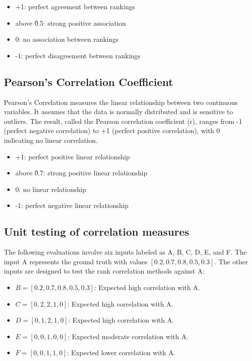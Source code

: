 \begin{itemize}
    \item +1: perfect agreement between rankings
    \item above \~ 0.5: strong positive association
    \item 0: no association between rankings
    \item -1: perfect disagreement between rankings
\end{itemize}

\subsection{Pearson's Correlation Coefficient}\label{pearsons-correlation-coefficient}

Pearson's Correlation measures the linear relationship between two continuous variables. It assumes that the data is normally distributed and is sensitive to outliers. The result, called the Pearson correlation coefficient (r), ranges from -1 (perfect negative correlation) to +1 (perfect positive correlation), with 0 indicating no linear correlation.

\begin{itemize}
    \item +1: perfect positive linear relationship
    \item above \~ 0.7: strong positive linear relationship
    \item 0: no linear relationship
    \item -1: perfect negative linear relationship
\end{itemize}

\subsection{Unit testing of correlation measures}\label{unit-testing-of-correlation-measures}

The following evaluations involve six inputs labeled as A, B, C, D, E, and F. 
The input A represents the ground truth with values \([0.2, 0.7, 0.8, 0.5, 0.3]\). 
The other inputs are designed to test the rank correlation methods against A:
\begin{itemize}
    \item \(B = [0.2, 0.7, 0.8, 0.5, 0.3]\): Expected high correlation with A.
    \item \(C = [0, 2, 2, 1, 0]\): Expected high correlation with A.
    \item \(D = [0, 1, 2, 1, 0]\): Expected high correlation with A.
    \item \(E = [0, 0, 1, 0, 0]\): Expected moderate correlation with A.
    \item \(F = [0, 0, 1, 1, 0]\): Expected lower correlation with A.
\end{itemize}

